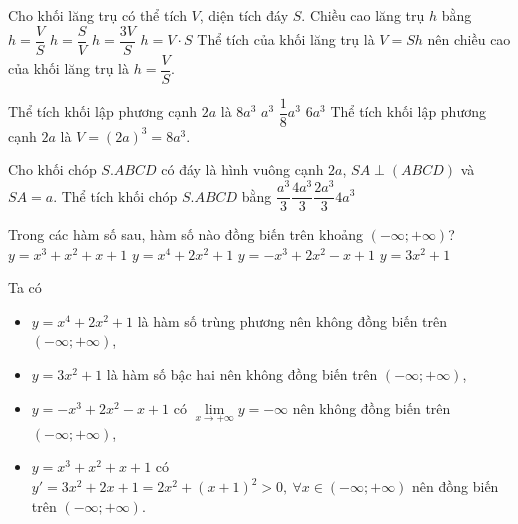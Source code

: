 \begin{ex}%
Cho khối lăng trụ có thể tích $V$, diện tích đáy $S$. Chiều cao lăng trụ $h$ bằng
\choice
{\True $h=\dfrac{V}{S}$}
{$h=\dfrac{S}{V}$}
{$h=\dfrac{3V}{S}$}
{$h=V\cdot S$}
\loigiai
{Thể tích của khối lăng trụ là $V=Sh$ nên chiều cao của khối lăng trụ là $h=\dfrac{V}{S}$.
}
\end{ex}

\begin{ex}%
Thể tích khối lập phương cạnh $2a$ là 
\choice
{\True $8a^3$}
{$a^3$}
{$\dfrac{1}{8}a^3$}
{$6a^3$}
\loigiai
{Thể tích khối lập phương cạnh $2a$ là $V=(2a)^3=8a^3$.
}
\end{ex}

\begin{ex}%
	Cho khối chóp $S.ABCD$ có đáy là hình vuông cạnh $2a$, $SA\perp (ABCD)$ và $SA=a$. Thể tích khối chóp $S.ABCD$ bằng
	\choice
	{$\dfrac{a^3}{3}$}{\True $\dfrac{4a^3}{3}$}{$\dfrac{2a^3}{3}$}{$4a^3$}
\end{ex}

\begin{ex}%
Trong các hàm số sau, hàm số nào đồng biến trên khoảng $(-\infty;+\infty)$?
\choice
{\True $y=x^3+x^2+x+1$}
{$y=x^4+2x^2+1$}
{$y=-x^3+2x^2-x+1$}
{$y=3x^2+1$}
\loigiai
{Ta có \begin{itemize}
\item $y=x^4+2x^2+1$ là hàm số trùng phương nên không đồng biến trên $(-\infty;+\infty)$,
\item $y=3x^2+1$ là hàm số bậc hai nên không đồng biến trên $(-\infty;+\infty)$,
\item $y=-x^3+2x^2-x+1$ có $\lim\limits_{x\to +\infty}y=-\infty$ nên không đồng biến trên $(-\infty;+\infty)$,
\item $y=x^3+x^2+x+1$ có $y'=3x^2+2x+1=2x^2+(x+1)^2>0,\ \forall x\in (-\infty;+\infty)$ nên đồng biến trên $(-\infty;+\infty)$.
\end{itemize}
}
\end{ex}

